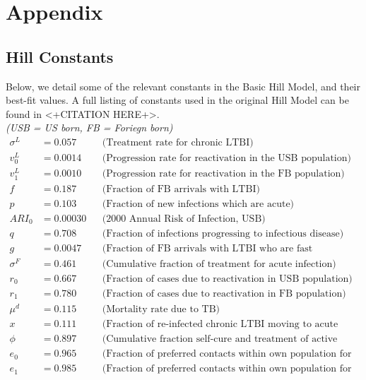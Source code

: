 \documentclass{amsart}
\begin{document}
\section{Appendix}
\subsection{Hill Constants}
\label{subsec:hillConstants}
Below, we detail some of the relevant constants in the Basic Hill Model, and
their best-fit values. A full listing of constants used in the original Hill
Model can be found in <+CITATION HERE+>. \\
\textit{(USB = US born, FB = Foriegn born)}
\begin{align*}
  \sigma^{L} &= 0.057   &&\text{(Treatment rate for chronic LTBI)}\\
  v^{L}_{0}  &= 0.0014  &&\text{(Progression rate for reactivation in the USB
                                 population)}\\
  v^{L}_{1}  &= 0.0010  &&\text{(Progression rate for reactivation in the FB
                                 population)}\\
  f          &= 0.187   &&\text{(Fraction of FB arrivals with LTBI)}\\
  p          &= 0.103   &&\text{(Fraction of new infections which are acute)}\\
  ARI_{0}    &= 0.00030 &&\text{(2000 Annual Risk of Infection, USB)}\\
  q          &= 0.708   &&\text{(Fraction of infections progressing to infectious
                                 disease)}\\
  g          &= 0.0047  &&\text{(Fraction of FB arrivals with LTBI who are fast
                                 progressors)}\\
  \sigma^{F} &= 0.461   &&\text{(Cumulative fraction of treatment for acute
                                 infection)}\\
  r_{0}      &= 0.667   &&\text{(Fraction of cases due to reactivation in USB
                                 population)}\\
  r_{1}      &= 0.780   &&\text{(Fraction of cases due to reactivation in FB
                                 population)}\\
  \mu^{d}    &= 0.115   &&\text{(Mortality rate due to TB)}\\
  x          &= 0.111   &&\text{(Fraction of re-infected chronic LTBI moving to
                                 acute infection)}\\
  \phi       &= 0.897   &&\text{(Cumulative fraction self-cure and treatment of
                                 active disease)}\\
  e_{0}      &= 0.965   &&\text{(Fraction of preferred contacts within own
                                 population for USB)}\\
  e_{1}      &= 0.985   &&\text{(Fraction of preferred contacts within own
                                population for FB)}\\
\end{align*}
\end{document}
